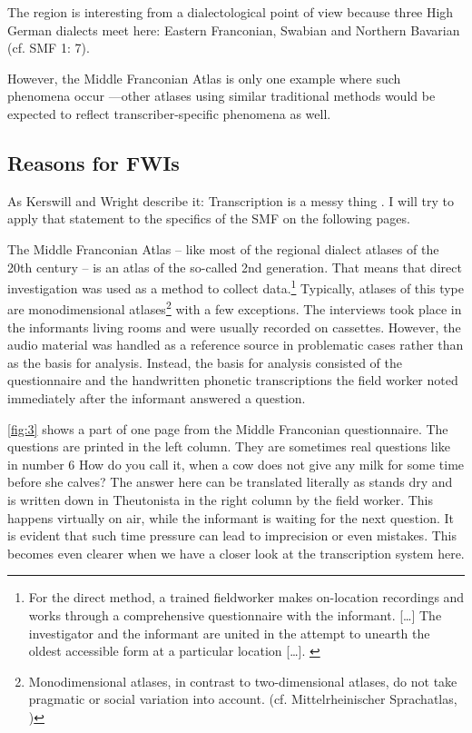 \documentclass[output=paper]{LSP/langsci}
\begin{document}
The region is interesting from a dialectological point of view because three High German dialects meet here: Eastern Franconian, Swabian and Northern Bavarian (cf. SMF 1: 7).

However, the Middle Franconian Atlas is only one example where such phenomena occur —other atlases using similar traditional methods would be expected to reflect transcriber-specific phenomena as well.

\subsection{Reasons for FWIs}
As Kerswill and Wright describe it: {\textquotedbl}Transcription is a messy thing{\textquotedbl} \citep[273]{kerswill_limits_1990}. I will try to apply that statement to the specifics of the SMF on the following pages.

The Middle Franconian Atlas – like most of the regional dialect atlases of the 20th century – is an atlas of the so-called 2nd generation. That means that direct investigation was used as a method to collect data.\footnote{For the direct method, a {\textquotedbl}trained fieldworker makes on-location recordings and works through a comprehensive questionnaire with the informant. […] The investigator and the informant are united in the attempt to unearth the oldest accessible form at a particular location […].{\textquotedbl} \citep[502]{konig_investigating_2010}} Typically, atlases of this type are monodimensional atlases\footnote{Monodimensional atlases, in contrast to two-dimensional atlases, do not take pragmatic or social variation into account. (cf. Mittelrheinischer Sprachatlas,  \citealt{bellmann_mittelrheinischer_????} %
)} with a few exceptions. The interviews took place in the informants{\textquotesingle} living rooms and were usually recorded on cassettes. However, the audio material was handled as a reference source in problematic cases rather than as the basis for analysis. Instead, the basis for analysis consisted of the questionnaire and the handwritten phonetic transcriptions the field worker noted immediately after the informant answered a question.

\ref{fig:3} shows a part of one page from the Middle Franconian questionnaire. The {\textquotedbl}questions{\textquotedbl} are printed in the left column. They are sometimes real questions like in number 6 {\textquotedbl}How do you call it, when a cow does not give any milk for some time before she calves?{\textquotedbl} The answer here can be translated literally as {\textquotedbl}stands dry{\textquotedbl} and is written down in Theutonista in the right column by the field worker. This happens virtually {\textquotedbl}on air{\textquotedbl}, while the informant is waiting for the next question. It is evident that such time pressure can lead to imprecision or even mistakes. This becomes even clearer when we have a closer look at the transcription system here.
\end{document}
